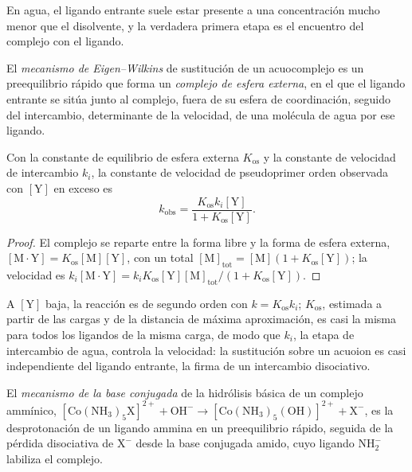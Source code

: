 En agua, el ligando entrante suele estar presente a una concentración mucho menor
que el disolvente, y la verdadera primera etapa es el encuentro del complejo con el
ligando.

\begin{definition}\label{def:b3:complex-mechanisms:eigen-wilkins}
El \emph{mecanismo de Eigen--Wilkins} de
sustitución de un acuocomplejo es un preequilibrio rápido que forma un
\emph{complejo de esfera externa}, en el que el ligando
entrante se sitúa junto al complejo, fuera de su esfera de coordinación, seguido del
intercambio, determinante de la velocidad, de una molécula de agua por ese ligando.
\end{definition}

\begin{theorem}\label{thm:b3:complex-mechanisms:eigen-wilkins}
Con la constante de equilibrio de esfera externa $K_{\mathrm{os}}$ y la constante de velocidad de intercambio
$k_i$, la constante de velocidad de pseudoprimer orden observada con $[\mathrm Y]$ en exceso es
\[
  k_{\mathrm{obs}} = \frac{K_{\mathrm{os}}k_i[\mathrm Y]}{1 + K_{\mathrm{os}}[\mathrm Y]} .
\]
\end{theorem}

\begin{proof}
El complejo se reparte entre la forma libre y la forma de esfera externa, $[\mathrm{M\cdot Y}] = K_{\mathrm{os}}[\mathrm M][\mathrm Y]$,
con un total $[\mathrm M]_{\mathrm{tot}} = [\mathrm M](1 + K_{\mathrm{os}}[\mathrm Y])$; la velocidad es $k_i[\mathrm{M\cdot Y}] = k_iK_{\mathrm{os}}[\mathrm Y][\mathrm M]_{\mathrm{tot}}/(1 + K_{\mathrm{os}}[\mathrm Y])$.
\end{proof}

A $[\mathrm Y]$ baja, la reacción es de segundo orden con $k = K_{\mathrm{os}}k_i$; $K_{\mathrm{os}}$, estimada a partir de las
cargas y de la distancia de máxima aproximación, es casi la misma para todos los
ligandos de la misma carga, de modo que $k_i$, la etapa de intercambio de agua, controla la
velocidad: la sustitución sobre un acuoion es casi independiente del ligando
entrante, la firma de un intercambio disociativo.

\begin{definition}\label{def:b3:complex-mechanisms:conjugate-base}
El \emph{mecanismo de la base conjugada} de la hidrólisis
básica de un complejo ammínico, $\mathrm{[Co(NH_3)_5X]^{2+} + OH^- \to [Co(NH_3)_5(OH)]^{2+} + X^-}$, es
la desprotonación de un ligando ammina en un preequilibrio rápido, seguida de la
pérdida disociativa de $\mathrm X^-$ desde la base conjugada amido, cuyo ligando $\mathrm{NH_2^-}$
labiliza el complejo.
\end{definition}

